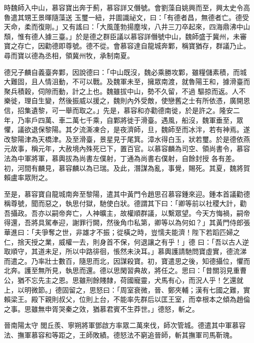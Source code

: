 \begin{pinyinscope}
 時魏師入中山，慕容寶出奔于薊，慕容詳又僭號。會劉藻自姚興而至，興太史令高魯遣其甥王景暉隨藻送
 玉璽一紐，并圖識祕文，曰：「有德者昌，無德者亡。德受天命，柔而復剛。」又有謠曰：「大風蓬勃揚塵埃，八井三刀卒起來，四海鼎沸中山頹，惟有德人據三臺。」於是德之群臣議以慕容詳僭號中山，魏師盛于冀州，未審寶之存亡，因勸德即尊號。德不從。會慕容達自龍城奔鄴，稱寶猶存，群議乃止。尋而寶以德為丞相，領冀州牧，承制南夏。



 德兄子麟自義臺奔鄴，因說德曰：「中山既沒，魏必乘勝攻鄴，雖糧儲素積，而城大難固，且人情沮動，不可以戰。及魏軍未至，擁眾南渡，就魯陽王和，據滑臺而聚兵積穀，伺隙而動，計之上也。魏雖拔中山，勢不久留，不過
 驅掠而返。人不樂徙，理自生變，然後振威以援之，魏則內外受敵，使戀舊之士有所依憑，廣開恩信，招集遺黎，可一舉而取之。」先是，慕容和亦勸德南徙，於是許之。隆安二年，乃率戶四萬、車二萬七千乘，自鄴將徙于滑臺。遇風，船沒，魏軍垂至，眾懼，議欲退保黎陽。其夕流澌凍合，是夜濟師，旦，魏師至而冰泮，若有神焉。遂改黎陽津為天橋津。及至滑臺，景星見于尾箕。漳水得白玉，狀若璽。於是德依燕元故事，稱元年，大赦境內殊死已下，置百官。以慕容麟為司空、領尚書令，慕容法為中軍將軍，慕輿拔為尚書左僕射，丁通為尚書右僕射，自餘封授
 各有差。初，河間有麟見，慕容麟以為已瑞。及此，潛謀為亂，事覺，賜死。其夏，魏將賀賴盧率眾附之。



 至是，慕容寶自龍城南奔至黎陽，遣其中黃門令趙思召慕容鍾來迎。鍾本首議勸德稱尊號，聞而惡之，執思付獄，馳使白狀。德謂其下曰：「卿等前以社稷大計，勸吾攝政。吾亦以嗣帝奔亡，人神曠主，故權順群議，以繫眾望。今天方悔禍，嗣帝得還，吾將具駕奉迎，謝罪行闕，然後角巾私第，卿等以為何如？」其黃門侍郎張華進曰：「夫爭奪之世，非雄才不振；從橫之時，豈懦夫能濟！陛下若蹈匹婦之仁，捨天授之業，威權一去，則身首不保，何退讓之有乎！」德
 曰：「吾以古人逆取順守，其道未足，所以中路徘徊，悵然未決耳。」慕輿護請馳問寶虛實，德流涕而遣之。乃率壯士數百，隨思而北，因謀殺寶。初，寶遣思之後，知德攝位，懼而北奔。護至無所見，執思而還。德以思閑習典故，將任之。思曰：「昔關羽見重曹公，猶不忘先主之恩。思雖刑餘賤隸，荷國寵靈，犬馬有心，而況人乎！乞還就上，以明微節。」德固留之，思怒曰：「周室衰微，晉、鄭夾輔；漢有七國之難，實賴梁王。殿下親則叔父，位則上台，不能率先群后以匡王室，而幸根本之傾為趙倫之事。思雖無申胥哭秦之效，猶慕君賓不生莽世。」德怒，斬之。



 晉南陽太守
 閭丘羨、寧朔將軍鄧啟方率眾二萬來伐，師次管城。德遣其中軍慕容法、撫軍慕容和等距之，王師敗績。德怒法不窮追晉師，斬其撫軍司馬靳瑰。




\end{pinyinscope}
